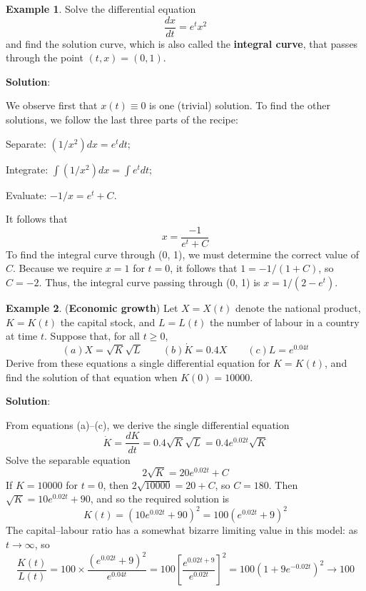 \documentclass[10pt,a4paper]{book}
\theoremstyle{definition}\newtheorem{definition}{Definition}
\theoremstyle{definition}\newtheorem{fact}{Fact}
\theoremstyle{definition}\newtheorem{ex}{Ex.}
\theoremstyle{definition}\newtheorem{project}{Project}
\theoremstyle{definition}\newtheorem{problem}{Problem}
\theoremstyle{definition}\newtheorem{example}{Example}
\numberwithin{theorem}{chapter}
\numberwithin{corollary}{chapter}
\numberwithin{assumption}{chapter}
\numberwithin{definition}{chapter}
\numberwithin{prop}{chapter}
\numberwithin{notation}{chapter}
\numberwithin{problem}{chapter}
\numberwithin{example}{chapter}
\numberwithin{fact}{chapter}
\numberwithin{ex}{chapter}
\begin{document}
	\begin{example}
		Solve the differential equation
		$$\frac{dx}{dt} = e^t x^2$$
		and find the solution curve, which is also called the \textbf{integral curve}, that passes through the point $(t, x) = (0, 1)$.
		
		\textbf{Solution}:
		
		We observe first that $x(t) \equiv 0$ is one (trivial) solution. To find the other solutions, we follow the last three parts of the recipe:
		
		Separate: $(1/x^2)dx = e^t dt$;
		
		Integrate: $\int (1/x^2)dx = \int e^t dt$;
		
		Evaluate: $-1/x = e^t + C$.
		
		It follows that
		$$ x = \frac{-1}{e^t + C}$$
		To find the integral curve through (0, 1), we must determine the correct value of $C$. Because we require $x = 1$ for $t = 0$, it follows that $1 = -1/(1 + C)$, so $C = -2$. Thus, the integral curve passing through (0, 1) is $x = 1/(2 - e^t )$.
	\end{example}
	
	\begin{example}
		(\textbf{Economic growth}) Let $X = X(t)$ denote the national product, $K = K(t)$ the capital stock, and $L = L(t)$ the number of labour in a country at time $t$. Suppose that, for all $t \geq 0$,
		\begin{equation*}
			(a) X = \sqrt{K}\sqrt{L} \qquad
			(b) \dot{K} = 0.4X \qquad
			(c) L = e^{0.04t}
		\end{equation*}
		Derive from these equations a single differential equation for $K = K(t)$, and find the solution of that equation when $K(0) = 10 000$.
		
		\textbf{Solution}:
		
		From equations (a)–(c), we derive the single differential equation
		$$\dot{K} = \frac{dK}{dt} = 0.4\sqrt{K}\sqrt{L} = 0.4e^{0.02t}\sqrt{K}$$
		Solve the separable equation
		$$2\sqrt{K} = 20e^{0.02t} + C$$
		If $K = 10000$ for $t = 0$, then $2\sqrt{10000} = 20+C$, so $C = 180$. Then $\sqrt{K} = 10e^{0.02t} +90$, and so the required solution is
		$$K(t) = (10e^{0.02t} + 90)^2 = 100(e^{0.02t} + 9)^2$$
		The capital–labour ratio has a somewhat bizarre limiting value in this model: as $t \rightarrow \infty$, so
		$$\frac{K(t)}{L(t)} = 100 \times \frac{(e^{0.02t}+9)^2}{e^{0.04t}} = 100 \left[ \frac{e^{0.02t + 9}}{e^{0.02t}} \right]^2 = 100(1+9e^{-0.02t})^2 \rightarrow 100$$
	\end{example}
	
\end{document}
